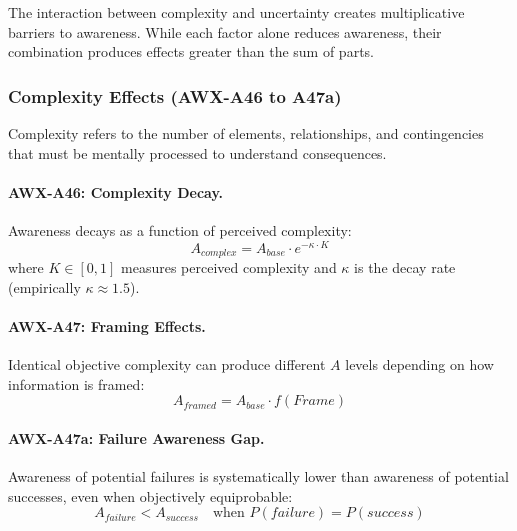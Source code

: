 
The interaction between complexity and uncertainty creates multiplicative 
barriers to awareness. While each factor alone reduces awareness, their 
combination produces effects greater than the sum of parts.

\subsubsection{Complexity Effects (AWX-A46 to A47a)}

Complexity refers to the number of elements, relationships, and contingencies 
that must be mentally processed to understand consequences.

\paragraph{AWX-A46: Complexity Decay.}
Awareness decays as a function of perceived complexity:
\begin{equation}
A_{complex} = A_{base} \cdot e^{-\kappa \cdot K}
\label{eq:complexity-decay}
\end{equation}
where $K \in [0,1]$ measures perceived complexity and $\kappa$ is the 
decay rate (empirically $\kappa \approx 1.5$).

\paragraph{AWX-A47: Framing Effects.}
Identical objective complexity can produce different $A$ levels depending 
on how information is framed:
\begin{equation}
A_{framed} = A_{base} \cdot f(Frame)
\end{equation}

\paragraph{AWX-A47a: Failure Awareness Gap.}
Awareness of potential failures is systematically lower than awareness of 
potential successes, even when objectively equiprobable:
\begin{equation}
A_{failure} < A_{success} \quad \text{when } P(failure) = P(success)
\end{equation}

